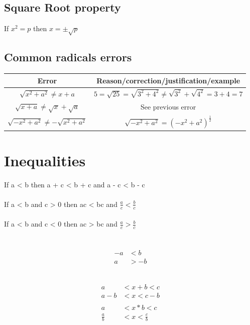 \documentclass[10pt,onecolumn]{article}
\begin{document}
\subsection{Square Root property}
If $ x^2 = p $ then $ x = \pm \sqrt{p}$

\subsection{Common radicals errors}

\begin{center}
{\renewcommand{\arraystretch}{2}
\begin{tabular}{| c | c | }
\hline
Error & Reason/correction/justification/example \\
\hline
$\sqrt{x^2 + a^2} \neq x + a $ & $5 = \sqrt{25} = \sqrt{3^2 + 4^2} \neq \sqrt{3^2} + \sqrt{4^2} = 3 + 4 = 7 $ \\
\hline
$\sqrt{x + a} \neq \sqrt{x} + \sqrt{a} $ & See previous error \\
\hline
$\sqrt{-x^2 + a^2} \neq -\sqrt{x^2 + a^2} $ & $\sqrt{-x^2 + a^2} = (-x^2 + a^2)^\frac{1}{2}$ \\
\hline
\end{tabular}}
\end{center}

\section{Inequalities}
If a < b then a + c < b + c and a - c < b - c \\\\
If a < b and c > 0 then ac < bc and $\frac{a}{c} < \frac{b}{c}$ \\\\
If a < b and c < 0 then ac > bc and $\frac{a}{c} > \frac{b}{c}$ \\\\

 \\
\begin{align*}
-a &< b \\
a &> -b
\end{align*}

 \\
\begin{align*}
a 	&< x + b 	< c \\
a - b 	&< x 		< c - b \\ 
\\
a &< x*b < c \\
\frac{a}{b}  &< x < \frac{c}{b} \\
\end{align*}
\end{document}
